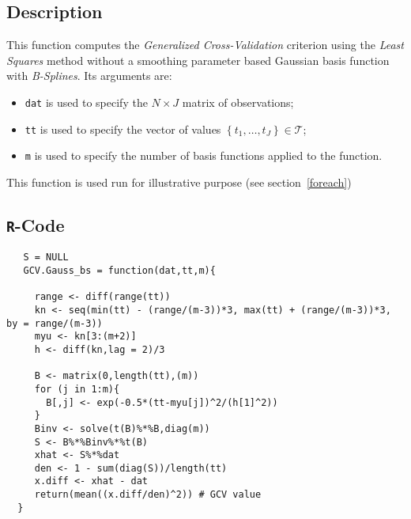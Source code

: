 \subsection*{Description}
  This function computes the \textit{Generalized Cross-Validation} criterion using the \textit{Least Squares} method without a smoothing parameter based Gaussian basis function with \textit{B-Splines}. Its arguments are:
  \begin{itemize}
  \item \texttt{dat} is used to specify the $N \times J$ matrix of observations;
  \item \texttt{tt} is used to specify the vector of values $\left\lbrace t_{1},\dots,t_{J} \right\rbrace \in \mathcal{T}$;
  \item \texttt{m} is used to specify the number of basis functions applied to the function.
  \end{itemize} 
  This function is used run for illustrative purpose (see section~\ref{foreach})
  \subsection*{\texttt{R}-Code}
  \begin{lstlisting}
   S = NULL
   GCV.Gauss_bs = function(dat,tt,m){
     
     range <- diff(range(tt))
     kn <- seq(min(tt) - (range/(m-3))*3, max(tt) + (range/(m-3))*3, by = range/(m-3))
     myu <- kn[3:(m+2)]
     h <- diff(kn,lag = 2)/3
      
     B <- matrix(0,length(tt),(m))
     for (j in 1:m){
       B[,j] <- exp(-0.5*(tt-myu[j])^2/(h[1]^2))
     }
     Binv <- solve(t(B)%*%B,diag(m))
     S <- B%*%Binv%*%t(B)
     xhat <- S%*%dat
     den <- 1 - sum(diag(S))/length(tt)
     x.diff <- xhat - dat
     return(mean((x.diff/den)^2)) # GCV value
  }
    \end{lstlisting}

